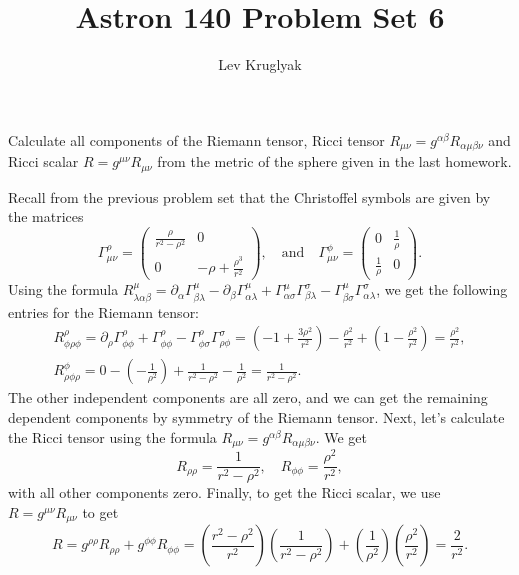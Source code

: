 \documentclass{../../templates/lkx_pset}
\title{Astron 140 Problem Set 6}
\author{Lev Kruglyak}
\begin{document}
\maketitle

\begin{problem}{1}
Calculate all components of the Riemann tensor, Ricci tensor $R_{\mu\nu} = g^{\alpha\beta}R_{\alpha\mu\beta\nu}$ and Ricci scalar $R = g^{\mu\nu}R_{\mu\nu}$ from the metric of the sphere given in the last homework.
\end{problem}

\begin{solution}
	Recall from the previous problem set that the Christoffel symbols are given by the matrices
	\[
		\Gamma^\rho_{\mu\nu} = \begin{pmatrix}\frac{\rho}{r^2-\rho^2} & 0                          \\
               0                       & -\rho + \frac{\rho^3}{r^2}\end{pmatrix},\quad\textrm{and}\quad
		\Gamma^\phi_{\mu\nu} = \begin{pmatrix}0&\frac{1}{\rho}\\\frac{1}{\rho}&0\end{pmatrix}.
	\]
	Using the formula $R^{\mu}_{\lambda\alpha\beta} = \partial_\alpha \Gamma^\mu_{\beta\lambda} - \partial_\beta \Gamma^\mu_{\alpha\lambda} + \Gamma^\mu_{\alpha\sigma} \Gamma^\sigma_{\beta\lambda} - \Gamma^\mu_{\beta\sigma}\Gamma^\sigma_{\alpha\lambda}$, we get the following entries for the Riemann tensor:
	\[
		\begin{aligned}
			R^{\rho}_{\phi\rho\phi} = \partial_\rho \Gamma^{\rho}_{\phi\phi} + \Gamma^{\rho}_{\phi\phi} - \Gamma^\rho_{\phi\sigma}\Gamma^\sigma_{\rho\phi} = \left(-1+\frac{3\rho^2}{r^2}\right) - \frac{\rho^2}{r^2} + \left(1- \frac{\rho^2}{r^2}\right) = \frac{\rho^2}{r^2}, \\
			R^{\phi}_{\rho\phi\rho} = 0 - \left(-\frac{1}{\rho^2}\right)+\frac{1}{r^2-\rho^2}-\frac{1}{\rho^2} = \frac{1}{r^2-\rho^2}.
		\end{aligned}
	\]
	The other independent components are all zero, and we can get the remaining dependent components by symmetry of the Riemann tensor. Next, let's calculate the Ricci tensor using the formula $R_{\mu\nu} = g^{\alpha\beta} R_{\alpha\mu\beta\nu}$. We get
	\[
		R_{\rho\rho} = \frac{1}{r^2-\rho^2},\quad R_{\phi\phi} = \frac{\rho^2}{r^2},
	\]
	with all other components zero. Finally, to get the Ricci scalar, we use $R=g^{\mu\nu}R_{\mu\nu}$ to get
	\[
		R = g^{\rho\rho}R_{\rho\rho} + g^{\phi\phi}R_{\phi\phi} = \left(\frac{r^2-\rho^2}{r^2}\right)\left(\frac{1}{r^2-\rho^2}\right) + \left(\frac{1}{\rho^2}\right)\left(\frac{\rho^2}{r^2}\right)=\frac{2}{r^2}.
\]
\end{solution}
\end{document}
